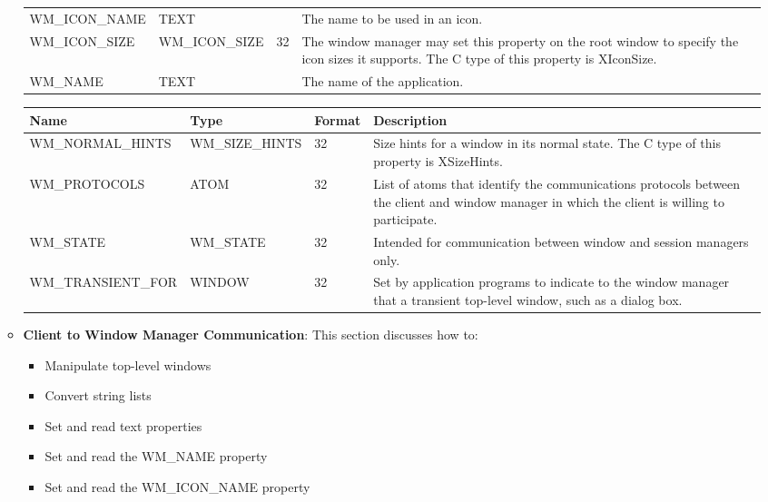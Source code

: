 \documentclass{report}
\begin{document}
\begin{itemize}
\begin{itemize}
\begin{center}
\begin{tabularx}{\textwidth}{@{}XllX@{}}
                    WM\_ICON\_NAME &TEXT& & The name to be used in an icon.\\[2ex]
                    WM\_ICON\_SIZE& WM\_ICON\_SIZE &32& The window manager may set this property on the root window to specify the icon sizes it supports. The C type of this property is XIconSize.\\[2ex]
                    WM\_NAME &TEXT& &The name of the application. \\
                    \bottomrule
                \end{tabularx}
            \end{center}
            \bigbreak \noindent 
            \begin{center}
                \begin{tabularx}{\textwidth}{@{}XllX@{}}
                    \toprule
                    \textbf{Name}& \textbf{Type}& \textbf{Format}& \textbf{Description} \\
                    \midrule
                    WM\_NORMAL\_HINTS &WM\_SIZE\_HINTS &32 &Size hints for a window in its normal state. The C type of this property is XSizeHints.\\[2ex]
                    WM\_PROTOCOLS &ATOM &32 &List of atoms that identify the communications protocols between the client and window manager in which the client is willing to participate.\\[2ex]
                    WM\_STATE& WM\_STATE &32 &Intended for communication between window and session managers only.\\[2ex]
                    WM\_TRANSIENT\_FOR &WINDOW &32 &Set by application programs to indicate to the window manager that a transient top-level window, such as a dialog box. \\
                    \bottomrule
                \end{tabularx}
            \end{center}
        \item \textbf{Client to Window Manager Communication}: This section discusses how to:
            \begin{itemize}
                \item Manipulate top-level windows
                \item Convert string lists
                \item Set and read text properties
                \item Set and read the WM\_NAME property
                \item Set and read the WM\_ICON\_NAME property

\end{itemize}
\end{itemize}
\end{itemize}
\end{document}
